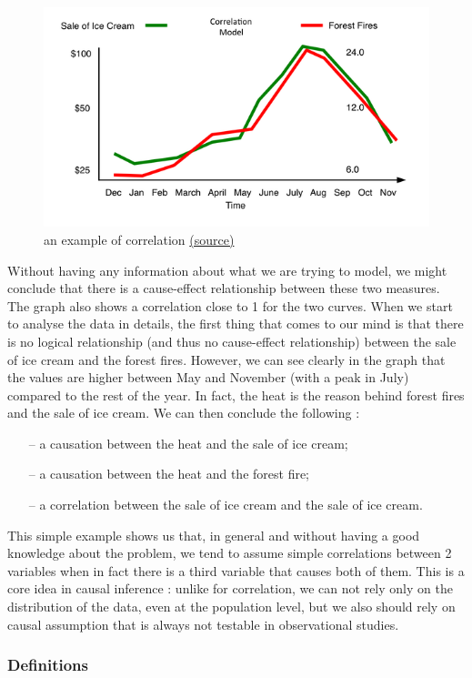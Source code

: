 \documentclass{article}
\begin{document}
\begin{figure}[h]
\centering
\includegraphics[width=0.6 \textwidth]{figures/corr_caus.png}
\caption{an example of correlation \href{https://www.decisionskills.com/blog/how-ice-cream-kills-understanding-cause-and-effect}{(source)}}
\end{figure}

Without having any information about what we are trying to model, we might conclude that there is a cause-effect relationship between these two measures. The graph also shows a correlation close to 1 for the two curves. When we start to analyse the data in details, the first thing that comes to our mind is that there is no logical relationship (and thus no cause-effect relationship) between the sale of ice cream and the forest fires. However, we can see clearly in the graph that the values are higher between May and November (with a peak in July) compared to the rest of the year. In fact, the heat is the reason behind forest fires and the sale of ice cream. We can then conclude the following : 

\begin{itemize}
\item[--] a causation between the heat and the sale of ice cream;
\item[--] a causation between the heat and the forest fire;
\item[--] a correlation between the sale of ice cream and the sale of ice cream.
\end{itemize}

This simple example shows us that, in general and without having a good knowledge about the problem, we tend to assume simple correlations between 2 variables when in fact there is a third variable that causes both of them. This is a core idea in causal inference : unlike for correlation, we can not rely only on the distribution of the data, even at the population level, but we also should rely on causal assumption that is always not testable in observational studies.\cite{pearl2010mathematics} 

	\subsubsection{Definitions}
	
\end{document}
